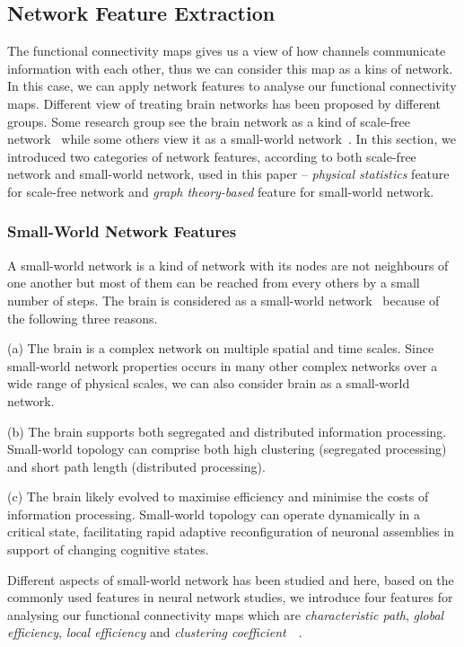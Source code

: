 \documentclass[conference]{IEEEtran}
\begin{document}
\subsection{Network Feature Extraction}
The functional connectivity maps gives us a view of how channels communicate information with each other, thus we can consider this map as a kins of network. In this case, we can apply network features to analyse our functional connectivity maps. Different view of treating brain networks has been proposed by different groups. Some research group see the brain network as a kind of scale-free network~\cite{eguiluz2005scale} while some others view it as a small-world network~\cite{bassett2006small}. In this section, we introduced two categories of network features, according to both scale-free network and small-world network, used in this paper -- \emph{physical statistics} feature for scale-free network and \emph{graph theory-based} feature for small-world network.

\subsubsection{Small-World Network Features}
A small-world network is a kind of network with its nodes are not neighbours of one another but most of them can be reached from every others by a small number of steps. The brain is considered as a small-world network~\cite{bassett2006small} because of the  following three reasons.

(a) The brain is a complex network on multiple spatial and time scales. Since small-world network properties occurs in many other complex networks over a wide range of physical scales, we can also consider brain as a small-world network.

(b) The brain supports both segregated and distributed information processing. Small-world topology can comprise both high clustering (segregated processing) and short path length (distributed processing).

(c) The brain likely evolved to maximise efficiency and minimise the costs of information processing. Small-world topology can operate dynamically in a critical state, facilitating rapid adaptive reconfiguration of neuronal assemblies in support of changing cognitive states.

Different aspects of small-world network has been studied and here, based on the commonly used features in neural network studies, we introduce four features for analysing our functional connectivity maps which are \emph{characteristic path}, \emph{global efficiency}, \emph{local efficiency} and \emph{clustering coefficient}~\cite{watts1998collective}~\cite{latora2001efficient}.
\end{document}
